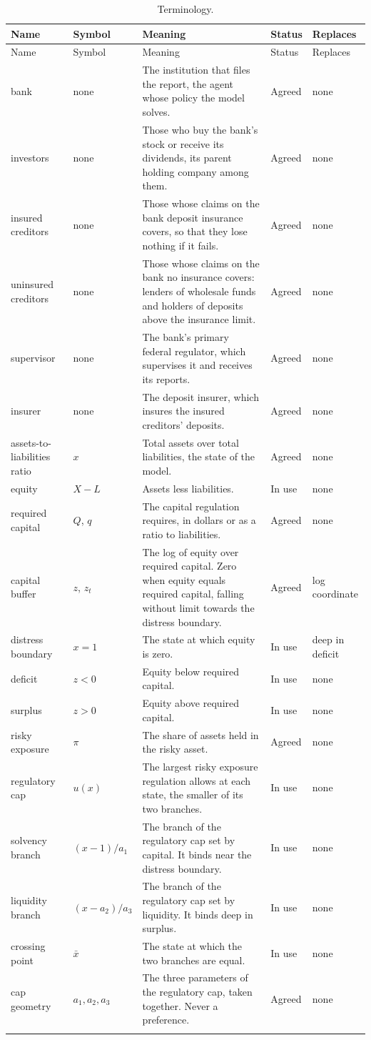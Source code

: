 \documentclass[11pt]{article}
\newcommand{\nrow}[5]{#1 & #2 & #3 & #4 & #5 \\ \addlinespace}
\begin{document}
\footnotesize
\begin{longtable}{@{}P{3.0cm}P{2.2cm}P{6.2cm}P{1.4cm}P{2.8cm}@{}}
\caption{Terminology.}\label{tab:terms}\\
\toprule
Name & Symbol & Meaning & Status & Replaces \\
\midrule
\endfirsthead
\toprule
Name & Symbol & Meaning & Status & Replaces \\
\midrule
\endhead
\nrow{bank}{none}{The institution that files the report, the agent whose policy the model solves.}{Agreed}{none}
\nrow{investors}{none}{Those who buy the bank's stock or receive its dividends, its parent holding company among them.}{Agreed}{none}
\nrow{insured creditors}{none}{Those whose claims on the bank deposit insurance covers, so that they lose nothing if it fails.}{Agreed}{none}
\nrow{uninsured creditors}{none}{Those whose claims on the bank no insurance covers: lenders of wholesale funds and holders of deposits above the insurance limit.}{Agreed}{none}
\nrow{supervisor}{none}{The bank's primary federal regulator, which supervises it and receives its reports.}{Agreed}{none}
\nrow{insurer}{none}{The deposit insurer, which insures the insured creditors' deposits.}{Agreed}{none}
\nrow{assets-to-liabilities ratio}{$x$}{Total assets over total liabilities, the state of the model.}{Agreed}{none}
\nrow{equity}{$X-L$}{Assets less liabilities.}{In use}{none}
\nrow{required capital}{$Q$, $q$}{The capital regulation requires, in dollars or as a ratio to liabilities.}{Agreed}{none}
\nrow{capital buffer}{$z$, $z_t$}{The log of equity over required capital. Zero when equity equals required capital, falling without limit towards the distress boundary.}{Agreed}{log coordinate}
\nrow{distress boundary}{$x=1$}{The state at which equity is zero.}{In use}{deep in deficit}
\nrow{deficit}{$z<0$}{Equity below required capital.}{In use}{none}
\nrow{surplus}{$z>0$}{Equity above required capital.}{In use}{none}
\nrow{risky exposure}{$\pi$}{The share of assets held in the risky asset.}{Agreed}{none}
\nrow{regulatory cap}{$u(x)$}{The largest risky exposure regulation allows at each state, the smaller of its two branches.}{In use}{none}
\nrow{solvency branch}{$(x-1)/a_1$}{The branch of the regulatory cap set by capital. It binds near the distress boundary.}{In use}{none}
\nrow{liquidity branch}{$(x-a_2)/a_3$}{The branch of the regulatory cap set by liquidity. It binds deep in surplus.}{In use}{none}
\nrow{crossing point}{$\bar x$}{The state at which the two branches are equal.}{In use}{none}
\nrow{cap geometry}{$a_1,a_2,a_3$}{The three parameters of the regulatory cap, taken together. Never a preference.}{Agreed}{none}

\end{longtable}
\end{document}
